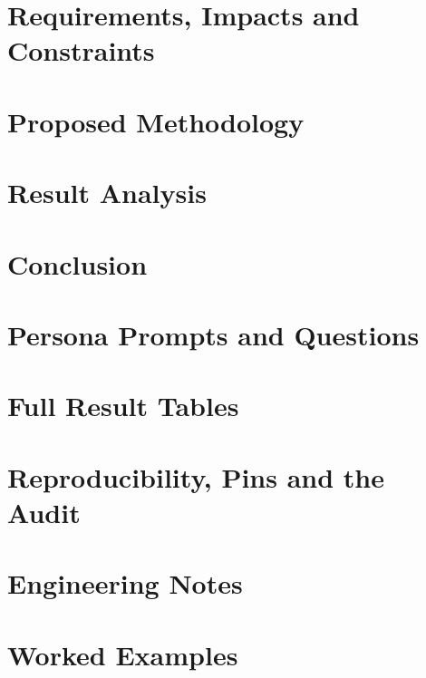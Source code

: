 \documentclass[Times,12pt,oneside,openany,print,index]{report}
\begin{document}
\chapter{Requirements, Impacts and Constraints
}



\chapter{Proposed Methodology}


\chapter{Result Analysis}





\chapter{Conclusion}

\printbibliography %

\appendix
\chapter{Persona Prompts and Questions}
\label{app:prompts}


\chapter{Full Result Tables}
\label{app:tables}


\chapter{Reproducibility, Pins and the Audit}
\label{app:repro}


\chapter{Engineering Notes}
\label{app:eng}


\chapter{Worked Examples}
\label{app:examples}

\end{document}
